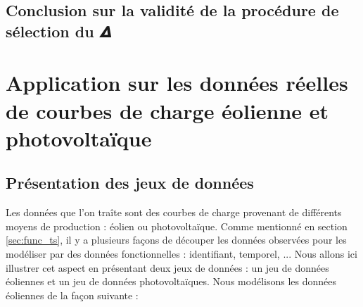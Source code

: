 \subsection{Conclusion sur la validité de la procédure de sélection du 𝜟}


\noindent 
\begin{center}
\end{center}

\section{
  Application sur les données réelles de courbes de charge éolienne et photovoltaïque
 }

\subsection{Présentation des jeux de données}

Les données que l'on traîte sont des courbes de charge provenant de différents moyens de production : éolien ou photovoltaïque. Comme mentionné en section \ref{sec:func_ts}, il y a plusieurs façons de découper les données observées pour les modéliser par des données fonctionnelles : identifiant, temporel, ... Nous allons ici illustrer cet aspect en présentant deux jeux de données : un jeu de données éoliennes et un jeu de données photovoltaïques. Nous modélisons les données éoliennes de la façon suivante :

\bigskip

